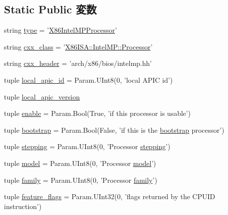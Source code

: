 \subsection*{Static Public 変数}
\begin{DoxyCompactItemize}
\item 
string \hyperlink{classIntelMP_1_1X86IntelMPProcessor_acce15679d830831b0bbe8ebc2a60b2ca}{type} = '\hyperlink{classIntelMP_1_1X86IntelMPProcessor}{X86IntelMPProcessor}'
\item 
string \hyperlink{classIntelMP_1_1X86IntelMPProcessor_a58cd55cd4023648e138237cfc0822ae3}{cxx\_\-class} = '\hyperlink{classX86ISA_1_1IntelMP_1_1Processor}{X86ISA::IntelMP::Processor}'
\item 
string \hyperlink{classIntelMP_1_1X86IntelMPProcessor_a17da7064bc5c518791f0c891eff05fda}{cxx\_\-header} = 'arch/x86/bios/intelmp.hh'
\item 
tuple \hyperlink{classIntelMP_1_1X86IntelMPProcessor_a50776c26d15de124f34400db4733af9a}{local\_\-apic\_\-id} = Param.UInt8(0, 'local APIC id')
\item 
tuple \hyperlink{classIntelMP_1_1X86IntelMPProcessor_a242d4d9f781280279fd12a2358a55284}{local\_\-apic\_\-version}
\item 
tuple \hyperlink{classIntelMP_1_1X86IntelMPProcessor_abe5c47d3a1803e0ccf098c3dc333116a}{enable} = Param.Bool(True, 'if this processor is usable')
\item 
tuple \hyperlink{classIntelMP_1_1X86IntelMPProcessor_a31b215e159e493a5899473c5acbfe726}{bootstrap} = Param.Bool(False, 'if this is the \hyperlink{classIntelMP_1_1X86IntelMPProcessor_a31b215e159e493a5899473c5acbfe726}{bootstrap} processor')
\item 
tuple \hyperlink{classIntelMP_1_1X86IntelMPProcessor_add0c8d8c5208bd8afde960dafafd2d5d}{stepping} = Param.UInt8(0, 'Processor \hyperlink{classIntelMP_1_1X86IntelMPProcessor_add0c8d8c5208bd8afde960dafafd2d5d}{stepping}')
\item 
tuple \hyperlink{classIntelMP_1_1X86IntelMPProcessor_a71f58678b345ddafeef7c59714d69e1a}{model} = Param.UInt8(0, 'Processor \hyperlink{classIntelMP_1_1X86IntelMPProcessor_a71f58678b345ddafeef7c59714d69e1a}{model}')
\item 
tuple \hyperlink{classIntelMP_1_1X86IntelMPProcessor_a02b003732f44d1f2905d30d841ce3015}{family} = Param.UInt8(0, 'Processor \hyperlink{classIntelMP_1_1X86IntelMPProcessor_a02b003732f44d1f2905d30d841ce3015}{family}')
\item 
tuple \hyperlink{classIntelMP_1_1X86IntelMPProcessor_a5308a8ffac73c8415129f79f03c86466}{feature\_\-flags} = Param.UInt32(0, 'flags returned by the CPUID instruction')
\end{DoxyCompactItemize}


